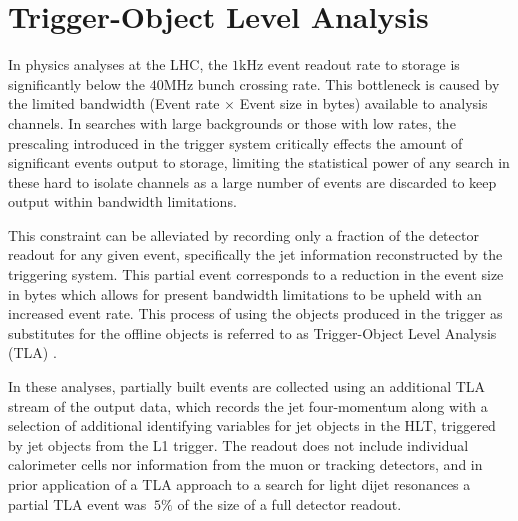 \section{Trigger-Object Level Analysis}

	In physics analyses at the LHC, the $1$kHz event readout rate to storage is significantly below the $40$MHz bunch crossing rate. This bottleneck is caused by the limited bandwidth (Event rate $\times$ Event size in bytes) available to analysis channels. In searches with large backgrounds or those with low rates, the prescaling introduced in the trigger system critically effects the amount of significant events output to storage, limiting the statistical power of any search in these hard to isolate channels as a large number of events are discarded to keep output within bandwidth limitations.

	This constraint can be alleviated by recording only a fraction of the detector readout for any given event, specifically the jet information reconstructed by the triggering system. This partial event corresponds to a reduction in the event size in bytes which allows for present bandwidth limitations to be upheld with an increased event rate. This process of using the objects produced in the trigger as substitutes for the offline objects is referred to as Trigger-Object Level Analysis (TLA) \cite{tla}.

	In these analyses, partially built events are collected using an additional TLA stream of the output data, which records the jet four-momentum along with a selection of additional identifying variables for jet objects in the HLT, triggered by jet objects from the L1 trigger. The readout does not include individual calorimeter cells nor information from the muon or tracking detectors, and in prior application of a TLA approach to a search for light dijet resonances \cite{tla} a partial TLA event was $~5\%$ of the size of a full detector readout.




\endinput

